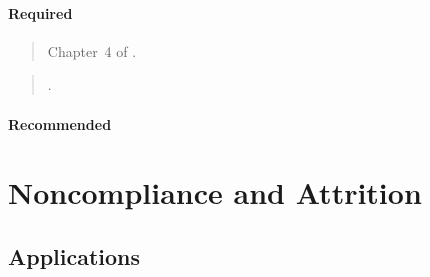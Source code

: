 \documentclass[12pt]{article}
\begin{document}
\paragraph*{Required}

\begin{verse}
  Chapter~4 of .
\end{verse}

\begin{verse}
  .
\end{verse}

\begin{verse}  \end{verse}

\paragraph*{Recommended}

\begin{verse}  \end{verse}

\begin{verse}  \end{verse}

\begin{verse}  \end{verse}

\begin{verse}  \end{verse}

\begin{verse}  \end{verse}

\begin{verse}  \end{verse}

\begin{verse}  \end{verse}


\section{Noncompliance and Attrition}

\subsection*{Applications}
\end{document}
